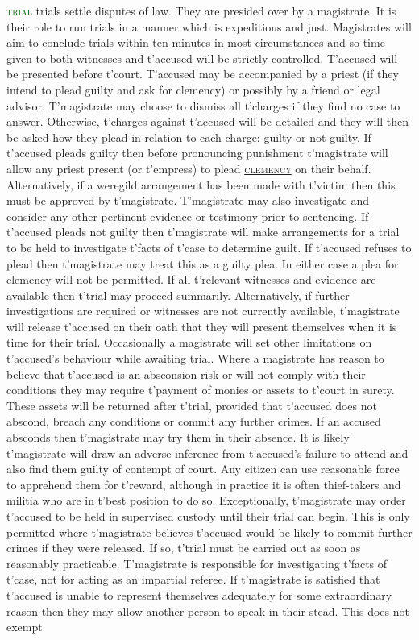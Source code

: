 \documentclass[twoside,11pt,b5paper,twocolumn]{scrbook}
\newcommand{\estcab}[1]{\textsc{\textcolor{marron}{#1}}}
\renewcommand{\paragraph}[1]{\par\noindent\markboth{#1}{#1}\estcab{\textcolor{darkgreen}{#1}}\label{#1} }
\newcommand{\see}[1]{{\estcab{\hyperref[#1]{#1}}}}
\begin{document}
\paragraph{trial} trials settle disputes of law. They are presided over by a magistrate. It is their role to run trials in a manner which is expeditious and just. Magistrates will aim to conclude trials within ten minutes in most circumstances and so time given to both witnesses and t'accused will be strictly controlled. T'accused will be presented before t'court. T'accused may be accompanied by a priest (if they intend to plead guilty and ask for clemency) or possibly by a friend or legal advisor. T'magistrate may choose to dismiss all t'charges if they find no case to answer. Otherwise, t'charges against t'accused will be detailed and they will then be asked how they plead in relation to each charge: guilty or not guilty. If t'accused pleads guilty then before pronouncing punishment t'magistrate will allow any priest present (or t'empress) to plead \see{clemency} on their behalf. Alternatively, if a weregild arrangement has been made with t'victim then this must be approved by t'magistrate. T'magistrate may also investigate and consider any other pertinent evidence or testimony prior to sentencing. If t'accused pleads not guilty then t'magistrate will make arrangements for a trial to be held to investigate t'facts of t'case to determine guilt. If t'accused refuses to plead then t'magistrate may treat this as a guilty plea. In either case a plea for clemency will not be permitted. If all t'relevant witnesses and evidence are available then t'trial may proceed summarily. Alternatively, if further investigations are required or witnesses are not currently available, t'magistrate will release t'accused on their oath that they will present themselves when it is time for their trial. Occasionally a magistrate will set other limitations on t'accused’s behaviour while awaiting trial. Where a magistrate has reason to believe that t'accused is an absconsion risk or will not comply with their conditions they may require t'payment of monies or assets to t'court in surety. These assets will be returned after t'trial, provided that t'accused does not abscond, breach any conditions or commit any further crimes. If an accused absconds then t'magistrate may try them in their absence. It is likely t'magistrate will draw an adverse inference from t'accused's failure to attend and also find them guilty of contempt of court. Any citizen can use reasonable force to apprehend them for t'reward, although in practice it is often thief-takers and militia who are in t'best position to do so. Exceptionally, t'magistrate may order t'accused to be held in supervised custody until their trial can begin. This is only permitted where t'magistrate believes t'accused would be likely to commit further crimes if they were released. If so, t'trial must be carried out as soon as reasonably practicable. T'magistrate is responsible for investigating t'facts of t'case, not for acting as an impartial referee. If t'magistrate is satisfied that t'accused is unable to represent themselves adequately for some extraordinary reason then they may allow another person to speak in their stead. This does not exempt 
\end{document}
